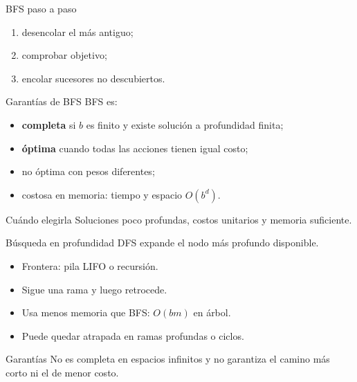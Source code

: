 \documentclass[aspectratio=169,11pt]{beamer}
\newcommand{\concepto}[1]{\textcolor{UAPTeal}{\textbf{#1}}}
\begin{document}
\begin{frame}{BFS paso a paso}
  \centering
  \vfill
  \begin{enumerate}
    \item desencolar el más antiguo; \item comprobar objetivo;
    \item encolar sucesores no descubiertos.
  \end{enumerate}
\end{frame}

\begin{frame}{Garantías de BFS}
  BFS es:
  \begin{itemize}
    \item \concepto{completa} si $b$ es finito y existe solución a profundidad finita;
    \item \concepto{óptima} cuando todas las acciones tienen igual costo;
    \item no óptima con pesos diferentes;
    \item costosa en memoria: tiempo y espacio $O(b^d)$.
  \end{itemize}
  \begin{block}{Cuándo elegirla}
    Soluciones poco profundas, costos unitarios y memoria suficiente.
  \end{block}
\end{frame}

\begin{frame}{Búsqueda en profundidad}
  DFS expande el nodo más profundo disponible.
  \begin{itemize}
    \item Frontera: pila LIFO o recursión.
    \item Sigue una rama y luego retrocede.
    \item Usa menos memoria que BFS: $O(bm)$ en árbol.
    \item Puede quedar atrapada en ramas profundas o ciclos.
  \end{itemize}
  \begin{alertblock}{Garantías}
    No es completa en espacios infinitos y no garantiza el camino más corto ni el de menor costo.
  \end{alertblock}
\end{frame}
\end{document}
